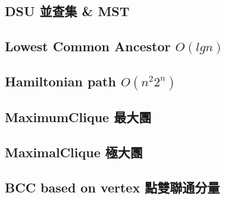 \documentclass[a4paper,10pt,twocolumn,oneside]{article}
\begin{document}
%

\subsection{DSU 並查集 \& MST}


\subsection{Lowest Common Ancestor $O(lgn)$}


\subsection{Hamiltonian path $O(n^{2}2^{n})$}


\subsection{MaximumClique 最大團}
% 


\subsection{MaximalClique 極大團}
% 


%

%

\subsection{BCC based on vertex 點雙聯通分量}

\end{document}
